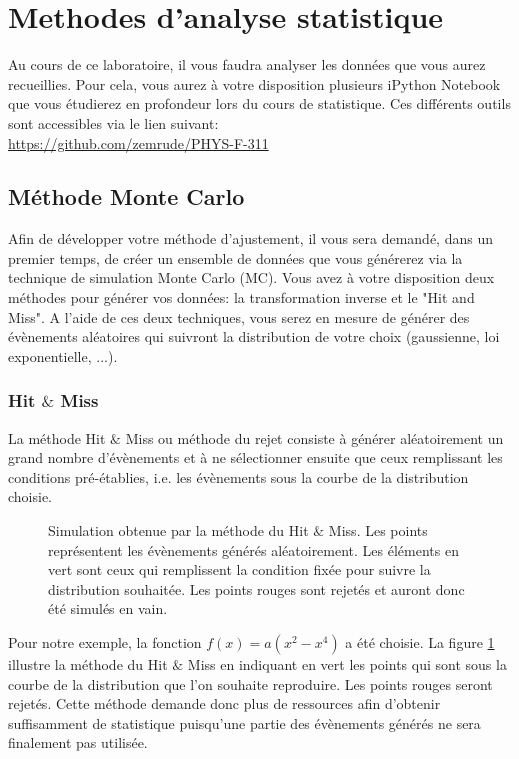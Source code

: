 \section{Methodes d'analyse statistique}

Au cours de ce laboratoire, il vous faudra analyser les données que vous aurez recueillies. Pour cela, vous aurez à votre disposition plusieurs iPython Notebook que vous étudierez en profondeur lors du cours de statistique. Ces différents outils sont accessibles via le lien suivant:\\
\url{https://github.com/zemrude/PHYS-F-311}

\subsection{Méthode Monte Carlo}
Afin de développer votre méthode d'ajustement, il vous sera demandé, dans un premier temps,  de créer un ensemble de données que vous générerez via la technique de simulation Monte Carlo (MC). Vous avez à votre disposition deux méthodes pour générer vos données: la transformation inverse et le "Hit and Miss". A l'aide de ces deux techniques, vous serez en mesure de générer des évènements aléatoires qui suivront la distribution de votre choix (gaussienne, loi exponentielle, ...).

\subsubsection{Hit $\&$ Miss}
La méthode Hit $\&$ Miss ou méthode du rejet consiste à générer aléatoirement un grand nombre d'évènements et à ne sélectionner ensuite que ceux remplissant les conditions pré-établies, i.e. les évènements sous la courbe de la distribution choisie. 

\begin{figure}[h!]
\caption{Simulation obtenue par la méthode du Hit $\&$ Miss. Les points représentent les évènements générés aléatoirement. Les éléments en vert sont ceux qui remplissent la condition fixée pour suivre la distribution souhaitée. Les points rouges sont rejetés et auront donc été simulés en vain.}
\label{fig:HitMiss}
\end{figure}

Pour notre exemple, la fonction $f(x)=a(x^{2}-x^{4})$ a été choisie. La figure \ref{fig:HitMiss} illustre la méthode du Hit $\&$ Miss en indiquant en vert les points qui sont sous la courbe de la distribution que l'on souhaite reproduire. Les points rouges seront rejetés. Cette méthode demande donc plus de ressources afin d'obtenir suffisamment de statistique puisqu'une partie des évènements générés ne  sera finalement pas utilisée.

